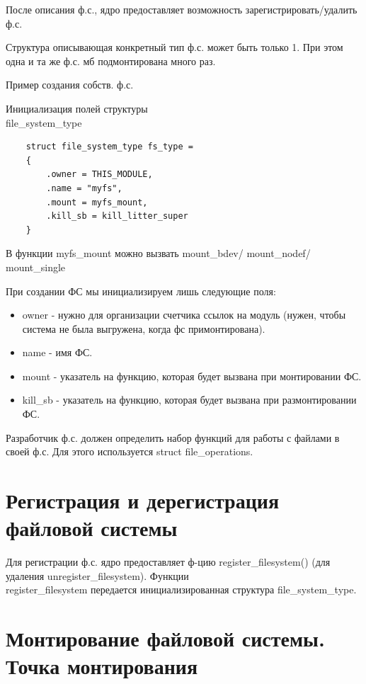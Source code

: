 После описания ф.с., ядро предоставляет возможность зарегистрировать/удалить ф.с.

Структура описывающая конкретный тип ф.с. может быть только 1. При этом одна и та же ф.с. мб подмонтирована много раз.

Пример создания собств. ф.с.

Инициализация полей структуры \\ file\_system\_type
\begin{lstlisting}
	struct file_system_type fs_type =
	{
		.owner = THIS_MODULE,
		.name = "myfs",
		.mount = myfs_mount,
		.kill_sb = kill_litter_super
	}
\end{lstlisting}

В функции myfs\_mount можно вызвать mount\_bdev/ mount\_nodef/ \\ mount\_single

При создании ФС мы инициализируем лишь следующие поля:

\begin{itemize}[label=---]
	\item owner - нужно для организации счетчика ссылок на модуль (нужен, чтобы система не была выгружена, когда фс примонтирована).
	\item name - имя ФС.
	\item  mount - указатель на функцию, которая будет вызвана при монтировании ФС.
	\item kill\_sb - указатель на функцию, которая будет вызвана при размонтировании ФС.
\end{itemize}

Разработчик ф.с. должен определить набор функций для работы с файлами в своей ф.с. Для этого используется struct file\_operations.

\section{Регистрация и дерегистрация файловой системы}

Для регистрации ф.с. ядро предоставляет ф-цию register\_filesystem() (для удаления unregister\_filesystem). Функции \\ register\_filesystem передается инициализированная структура file\_system\_type.


\section{Монтирование файловой системы. Точка монтирования}

